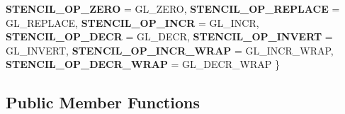 \begin{DoxyCompactItemize}
{\bfseries S\+T\+E\+N\+C\+I\+L\+\_\+\+O\+P\+\_\+\+Z\+E\+RO} = G\+L\+\_\+\+Z\+E\+RO, 
{\bfseries S\+T\+E\+N\+C\+I\+L\+\_\+\+O\+P\+\_\+\+R\+E\+P\+L\+A\+CE} = G\+L\+\_\+\+R\+E\+P\+L\+A\+CE, 
{\bfseries S\+T\+E\+N\+C\+I\+L\+\_\+\+O\+P\+\_\+\+I\+N\+CR} = G\+L\+\_\+\+I\+N\+CR, 
\newline
{\bfseries S\+T\+E\+N\+C\+I\+L\+\_\+\+O\+P\+\_\+\+D\+E\+CR} = G\+L\+\_\+\+D\+E\+CR, 
{\bfseries S\+T\+E\+N\+C\+I\+L\+\_\+\+O\+P\+\_\+\+I\+N\+V\+E\+RT} = G\+L\+\_\+\+I\+N\+V\+E\+RT, 
{\bfseries S\+T\+E\+N\+C\+I\+L\+\_\+\+O\+P\+\_\+\+I\+N\+C\+R\+\_\+\+W\+R\+AP} = G\+L\+\_\+\+I\+N\+C\+R\+\_\+\+W\+R\+AP, 
{\bfseries S\+T\+E\+N\+C\+I\+L\+\_\+\+O\+P\+\_\+\+D\+E\+C\+R\+\_\+\+W\+R\+AP} = G\+L\+\_\+\+D\+E\+C\+R\+\_\+\+W\+R\+AP
 \}
\end{DoxyCompactItemize}
\subsection*{Public Member Functions}
